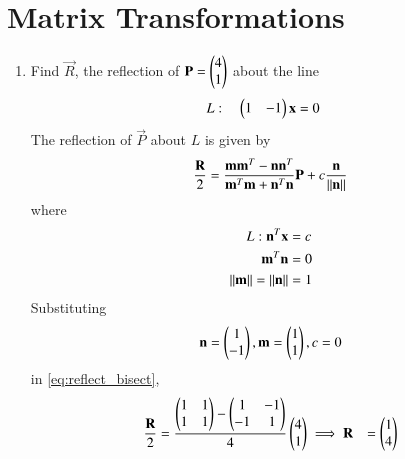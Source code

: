 \documentclass[journal,12pt,twocolumn]{IEEEtran}
\renewcommand\thesection{\arabic{section}}
\begin{document}
\section{Matrix Transformations}
\begin{enumerate}[label=\thesection.\arabic*
,ref=\thesection.\theenumi]

\item Find $\vec{R}$, the reflection  of $\mathbf{P}=\begin{pmatrix}4 \\ 1\end{pmatrix}$ about the line
\begin{align}
L: \quad \begin{pmatrix}1 & -1\end{pmatrix}\mathbf{x} &= 0
\end{align}
\solution The reflection of $\vec{P}$ about  $L$ is given by
\begin{align}
\label{eq:reflect_bisect}
\frac{\mathbf{R}}{2} = \frac{\mathbf{m}\mathbf{m}^T-\mathbf{n}\mathbf{n}^T}{\mathbf{m}^T\mathbf{m}+\mathbf{n}^T\mathbf{n}}\mathbf{P} + c 
\frac{\mathbf{n}}{\left\lVert\mathbf{n}\right\rVert}
\end{align}
%
where 
\begin{align}
L: \mathbf{n}^T\mathbf{x} &= c
\\
\mathbf{m}^T\mathbf{n} &= 0
\\
\left\lVert\mathbf{m}\right\rVert=\left\lVert\mathbf{n}\right\rVert &= 1
\end{align}
%
Substituting
\begin{align}
\mathbf{n} = \begin{pmatrix}1 \\ -1\end{pmatrix}, \mathbf{m} = \begin{pmatrix}1 \\ 1\end{pmatrix}, c = 0
\end{align}
%
in \eqref{eq:reflect_bisect},
\begin{align}
\frac{\mathbf{R}}{2} &= \frac{\begin{pmatrix}1 & 1 \\ 1 & 1\end{pmatrix}-\begin{pmatrix}1 & -1 \\ -1 & 1\end{pmatrix} }{4}\begin{pmatrix}4 \\ 1\end{pmatrix}
\implies \mathbf{R} &= \begin{pmatrix}1 \\ 4\end{pmatrix}
\end{align}


\end{enumerate}
\end{document}

